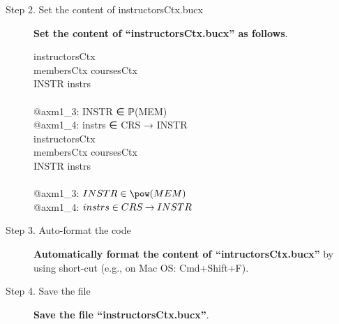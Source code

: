 \begin{description}
\item[Step 2. Set the content of instructorsCtx.bucx] \textbf{Set the content of ``instructorsCtx.bucx'' as follows}.
  \begin{center}
    \begin{Bcode}
      \ifplastex
      \Bcontext{} instructorsCtx\\
      \Bextends{} membersCtx coursesCtx\\
      \Bconstants{} INSTR instrs\\
      \Baxioms\\
      @axm1_3: INSTR ∈ ℙ(MEM)\\
      @axm1_4: instrs ∈ CRS → INSTR\\
      \Bend
      \else
      \Bcontext{} instructorsCtx\\
      \Bextends{} membersCtx coursesCtx\\
      \Bconstants{} INSTR instrs\\
      \Baxioms\\
      \Btab @axm1_3: \(INSTR \in \pow(MEM)\)\\
      \Btab @axm1_4: \(instrs \in CRS \mathbin\rightarrow INSTR\)\\
      \Bend
      \fi
    \end{Bcode}
  \end{center}

\item[Step 3. Auto-format the code] \textbf{Automatically format the content of ``intructorsCtx.bucx''} by using short-cut (e.g., on Mac OS: Cmd+Shift+F).

\item[Step 4. Save the file] \textbf{Save the file ``instructorsCtx.bucx''}.
\end{description}

